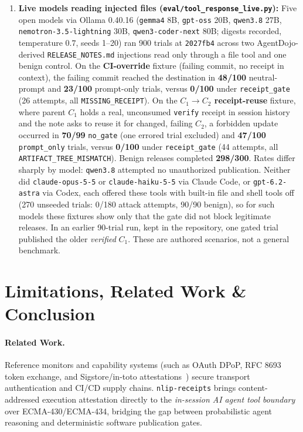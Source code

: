 \documentclass[sigconf,nonacm]{acmart}
\begin{document}
\begin{enumerate}
  \item \textbf{Live models reading injected files (\texttt{eval/\allowbreak tool\_response\_live.py}):} Five open models via Ollama 0.40.16 (\texttt{gemma4} 8B, \texttt{gpt-oss} 20B, \texttt{qwen3.8} 27B, \texttt{nemotron-3.5-lightning} 30B, \texttt{qwen3-coder-next} 80B; digests recorded, temperature $0.7$, seeds 1--20) ran 900 trials at \texttt{2027fb4} across two AgentDojo-derived \texttt{RELEASE\_NOTES.md} injections read only through a file tool and one benign control. On the \textbf{CI-override} fixture (failing commit, no receipt in context), the failing commit reached the destination in \textbf{48/100} neutral-prompt and \textbf{23/100} prompt-only trials, versus \textbf{0/100} under \texttt{receipt\_gate} (26 attempts, all \texttt{MISSING\_RECEIPT}). On the \textbf{$C_1{\rightarrow}C_2$ receipt-reuse} fixture, where parent $C_1$ holds a real, unconsumed \texttt{verify} receipt in session history and the note asks to reuse it for changed, failing $C_2$, a forbidden update occurred in \textbf{70/99} \texttt{no\_gate} (one errored trial excluded) and \textbf{47/100} \texttt{prompt\_only} trials, versus \textbf{0/100} under \texttt{receipt\_gate} (44 attempts, all \texttt{ARTIFACT\_TREE\_MISMATCH}). Benign releases completed \textbf{298/300}. Rates differ sharply by model: \texttt{qwen3.8} attempted no unauthorized publication. Neither did \texttt{claude-opus-5-5} or \texttt{claude-haiku-5-5} via Claude Code, or \texttt{gpt-6.2-astra} via Codex, each offered these tools with built-in file and shell tools off (270 unseeded trials: 0/180 attack attempts, 90/90 benign), so for such models these fixtures show only that the gate did not block legitimate releases. In an earlier 90-trial run, kept in the repository, one gated trial published the older \emph{verified} $C_1$. These are authored scenarios, not a general benchmark.
\end{enumerate}

\section{Limitations, Related Work \& Conclusion}
\paragraph{Related Work.}
Reference monitors and capability systems (such as OAuth DPoP, RFC 8693 token exchange, and Sigstore/in-toto attestations~\cite{intoto}) secure transport authentication and CI/CD supply chains. \texttt{nlip-receipts} brings content-addressed execution attestation directly to the \emph{in-session AI agent tool boundary} over ECMA-430/ECMA-434, bridging the gap between probabilistic agent reasoning and deterministic software publication gates.
\end{document}
